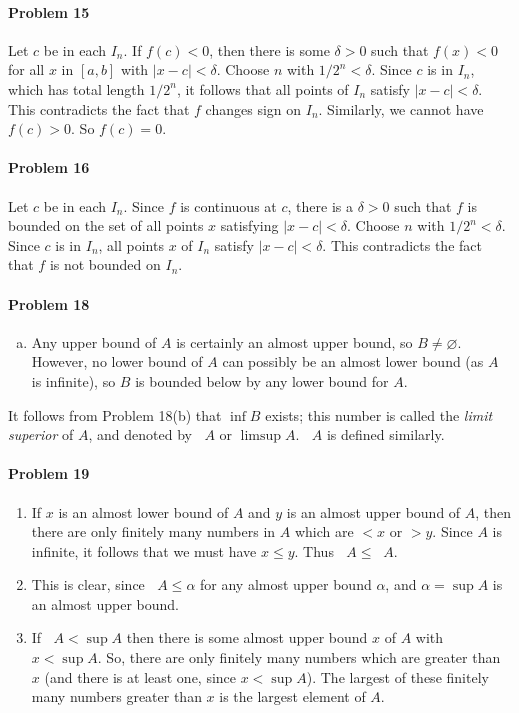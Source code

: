 \documentclass{article}
\DeclareMathOperator{\olim}{\overline{\lim}}
\DeclareMathOperator{\ulim}{\underline{\lim}}
\begin{document}
\paragraph{Problem 15} Let $c$ be in each $I_n$. If $f(c) < 0$, then there is
some $\delta > 0$ such that $f(x) < 0$ for all $x$ in $[a, b]$ with $|x - c| <
\delta$. Choose $n$ with $1/2^n < \delta$. Since $c$ is in $I_n$, which has
total length $1/2^n$, it follows that all points of $I_n$ satisfy $|x - c| <
\delta$. This contradicts the fact that $f$ changes sign on $I_n$. Similarly,
we cannot have $f(c) > 0$. So $f(c) = 0$.

\paragraph{Problem 16} Let $c$ be in each $I_n$. Since $f$ is continuous at $c$,
there is a $\delta > 0$ such that $f$ is bounded on the set of all points $x$
satisfying $|x - c| < \delta$. Choose $n$ with $1/2^n < \delta$. Since $c$ is
in $I_n$, all points $x$ of $I_n$ satisfy $|x - c| < \delta$. This contradicts
the fact that $f$ is not bounded on $I_n$.

\paragraph{Problem 18}
\begin{enumerate}[(b)]
  \item Any upper bound of $A$ is certainly an almost upper bound, so $B \neq
    \varnothing$. However, no lower bound of $A$ can possibly be an almost
    lower bound (as $A$ is infinite), so $B$ is bounded below by any lower
    bound for $A$.
\end{enumerate}

It follows from Problem 18(b) that $\inf B$ exists; this number is called the
\emph{limit superior} of $A$, and denoted by $\olim A$ or $\limsup A$.
$\ulim A$ is defined similarly.

\paragraph{Problem 19}
\begin{enumerate}
  \item If $x$ is an almost lower bound of $A$ and $y$ is an almost upper bound
    of $A$, then there are only finitely many numbers in $A$ which are $< x$ or
    $> y$. Since $A$ is infinite, it follows that we must have $x \leq y$. Thus
    $\ulim A \leq \olim A$.
  \item This is clear, since $\olim A \leq \alpha$ for any almost upper bound
    $\alpha$, and $\alpha = \sup A$ is an almost upper bound.
  \item If $\olim A < \sup A$ then there is some almost upper bound $x$ of $A$
    with $x < \sup A$. So, there are only finitely many numbers which are
    greater than $x$ (and there is at least one, since $x < \sup A$). The
    largest of these finitely many numbers greater than $x$ is the largest
    element of $A$.
\end{enumerate}
\end{document}
